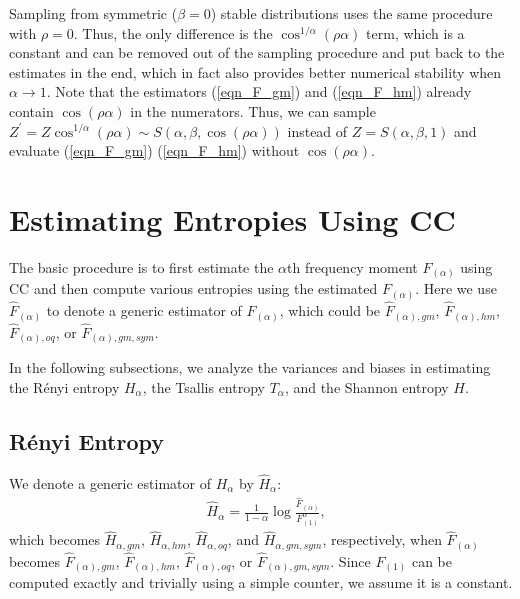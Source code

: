 \documentclass{sig-alternate}
\begin{document}
Sampling from symmetric ($\beta = 0$) stable distributions uses the same procedure with $\rho = 0$. Thus, the only difference is the $\cos^{1/\alpha}\left(\rho\alpha\right)$ term, which is  a constant and can be removed out of the sampling procedure and put back to the estimates in the end, which in fact also provides better numerical stability when $\alpha\rightarrow 1$. Note  that the estimators (\ref{eqn_F_gm}) and (\ref{eqn_F_hm}) already contain $\cos\left(\rho\alpha\right)$ in the numerators. Thus, we can sample $Z^\prime=Z\cos^{1/\alpha}\left(\rho\alpha\right)  \sim S\left(\alpha,\beta,\cos\left(\rho\alpha\right)\right)$ instead of $Z = S\left(\alpha,\beta,1\right)$ and evaluate (\ref{eqn_F_gm}) (\ref{eqn_F_hm}) without $\cos\left(\rho\alpha\right)$.


\section{Estimating Entropies Using CC}\label{sec_entropy_est}

The basic procedure is to first estimate the $\alpha$th frequency moment $F_{(\alpha)}$ using CC and then compute various entropies using the estimated $F_{(\alpha)}$. Here we use $\hat{F}_{(\alpha)}$ to denote a generic estimator of $\hat{F}_{(\alpha)}$, which could be $\hat{F}_{(\alpha),gm}$,  $\hat{F}_{(\alpha),hm}$,  $\hat{F}_{(\alpha),oq}$,  or $\hat{F}_{(\alpha),gm,sym}$.

In the following subsections, we analyze the variances and biases in estimating the R\'enyi entropy $H_\alpha$, the Tsallis entropy $T_\alpha$, and the Shannon entropy $H$.

\subsection{R\'enyi Entropy}

We denote a generic estimator of $H_\alpha$ by $\hat{H}_{\alpha}$:
\begin{align}\label{eqn_Renyi_est}
&\hat{H}_\alpha  = \frac{1}{1-\alpha} \log \frac{\hat{F}_{(\alpha)}}{F_{(1)}^\alpha},
\end{align}
which becomes $\hat{H}_{\alpha,gm}$,  $\hat{H}_{\alpha,hm}$,  $\hat{H}_{\alpha,oq}$,  and $\hat{H}_{\alpha,gm,sym}$, respectively, when $\hat{F}_{(\alpha)}$ becomes $\hat{F}_{(\alpha),gm}$,  $\hat{F}_{(\alpha),hm}$,  $\hat{F}_{(\alpha),oq}$,  or $\hat{F}_{(\alpha),gm,sym}$. Since $F_{(1)}$ can be computed exactly and trivially using a simple counter, we assume it is a constant.
\end{document}
